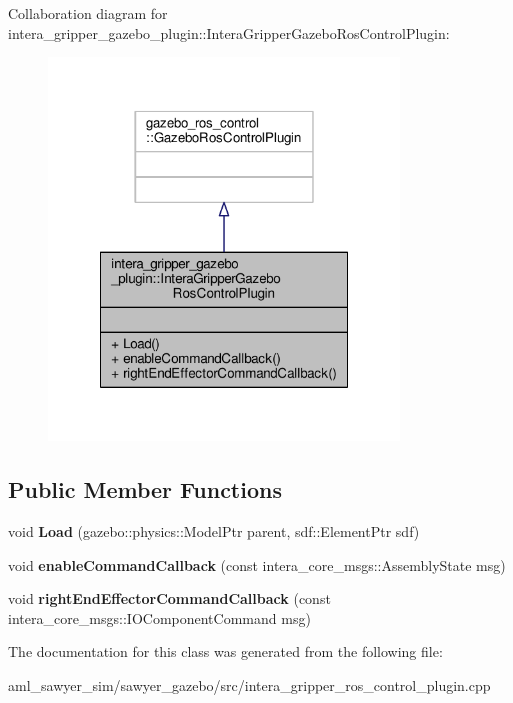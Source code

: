 Collaboration diagram for intera\-\_\-gripper\-\_\-gazebo\-\_\-plugin\-:\-:Intera\-Gripper\-Gazebo\-Ros\-Control\-Plugin\-:
\nopagebreak
\begin{figure}[H]
\begin{center}
\leavevmode
\includegraphics[width=264pt]{classintera__gripper__gazebo__plugin_1_1_intera_gripper_gazebo_ros_control_plugin__coll__graph}
\end{center}
\end{figure}
\subsection*{Public Member Functions}
\begin{DoxyCompactItemize}
\item 
\hypertarget{classintera__gripper__gazebo__plugin_1_1_intera_gripper_gazebo_ros_control_plugin_a8f4923c7fac9574158ef48fe5fb602b3}{void {\bfseries Load} (gazebo\-::physics\-::\-Model\-Ptr parent, sdf\-::\-Element\-Ptr sdf)}\label{classintera__gripper__gazebo__plugin_1_1_intera_gripper_gazebo_ros_control_plugin_a8f4923c7fac9574158ef48fe5fb602b3}

\item 
\hypertarget{classintera__gripper__gazebo__plugin_1_1_intera_gripper_gazebo_ros_control_plugin_a4f52a44cd216dcf0c92e3ae5af5cbfc4}{void {\bfseries enable\-Command\-Callback} (const intera\-\_\-core\-\_\-msgs\-::\-Assembly\-State msg)}\label{classintera__gripper__gazebo__plugin_1_1_intera_gripper_gazebo_ros_control_plugin_a4f52a44cd216dcf0c92e3ae5af5cbfc4}

\item 
\hypertarget{classintera__gripper__gazebo__plugin_1_1_intera_gripper_gazebo_ros_control_plugin_affda6050383c8b1f6ccdffd98fa688c2}{void {\bfseries right\-End\-Effector\-Command\-Callback} (const intera\-\_\-core\-\_\-msgs\-::\-I\-O\-Component\-Command msg)}\label{classintera__gripper__gazebo__plugin_1_1_intera_gripper_gazebo_ros_control_plugin_affda6050383c8b1f6ccdffd98fa688c2}

\end{DoxyCompactItemize}


The documentation for this class was generated from the following file\-:\begin{DoxyCompactItemize}
\item 
aml\-\_\-sawyer\-\_\-sim/sawyer\-\_\-gazebo/src/intera\-\_\-gripper\-\_\-ros\-\_\-control\-\_\-plugin.\-cpp\end{DoxyCompactItemize}
